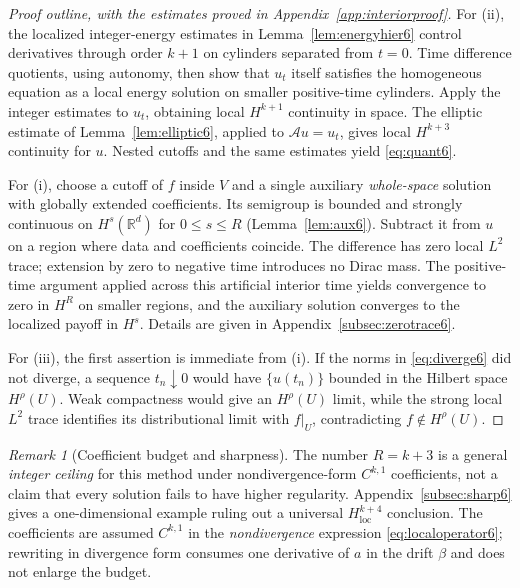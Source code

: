 \documentclass[11pt,a4paper]{article}
\theoremstyle{definition}\newtheorem{definition}{Definition}[section]\newtheorem{example}[theorem]{Example}
\theoremstyle{remark}\newtheorem{remark}[theorem]{Remark}\newtheorem{remarkSix}{Remark}[section]
\newcommand{\Rd}{\mathbb R^d}
\newcommand{\loc}{\mathrm{loc}}
\newcommand{\cA}{\mathcal A}
\begin{document}
\begin{proof}[Proof outline, with the estimates proved in Appendix~\ref{app:interiorproof}]
For (ii), the localized integer-energy estimates in Lemma~\ref{lem:energyhier6} control derivatives through order $k+1$ on cylinders separated from $t=0$. Time difference quotients, using autonomy, then show that $u_t$ itself satisfies the homogeneous equation as a local energy solution on smaller positive-time cylinders. Apply the integer estimates to $u_t$, obtaining local $H^{k+1}$ continuity in space. The elliptic estimate of Lemma~\ref{lem:elliptic6}, applied to $\cA u=u_t$, gives local $H^{k+3}$ continuity for $u$. Nested cutoffs and the same estimates yield \eqref{eq:quant6}.

For (i), choose a cutoff of $f$ inside $V$ and a single auxiliary \emph{whole-space} solution with globally extended coefficients. Its semigroup is bounded and strongly continuous on $H^s(\Rd)$ for $0\le s\le R$ (Lemma~\ref{lem:aux6}). Subtract it from $u$ on a region where data and coefficients coincide. The difference has zero local $L^2$ trace; extension by zero to negative time introduces no Dirac mass. The positive-time argument applied across this artificial interior time yields convergence to zero in $H^R$ on smaller regions, and the auxiliary solution converges to the localized payoff in $H^s$. Details are given in Appendix~\ref{subsec:zerotrace6}.

For (iii), the first assertion is immediate from (i). If the norms in \eqref{eq:diverge6} did not diverge, a sequence $t_n\downarrow0$ would have $\{u(t_n)\}$ bounded in the Hilbert space $H^\rho(U)$. Weak compactness would give an $H^\rho(U)$ limit, while the strong local $L^2$ trace identifies its distributional limit with $f|_U$, contradicting $f\notin H^\rho(U)$.
\end{proof}

\begin{remarkSix}[Coefficient budget and sharpness]\label{rem:budget6}
The number $R=k+3$ is a general \emph{integer ceiling} for this method under nondivergence-form $C^{k,1}$ coefficients, not a claim that every solution fails to have higher regularity. Appendix~\ref{subsec:sharp6} gives a one-dimensional example ruling out a universal $H^{k+4}_{\loc}$ conclusion. The coefficients are assumed $C^{k,1}$ in the \emph{nondivergence} expression \eqref{eq:localoperator6}; rewriting in divergence form consumes one derivative of $a$ in the drift $\beta$ and does not enlarge the budget.
\end{remarkSix}
\end{document}
